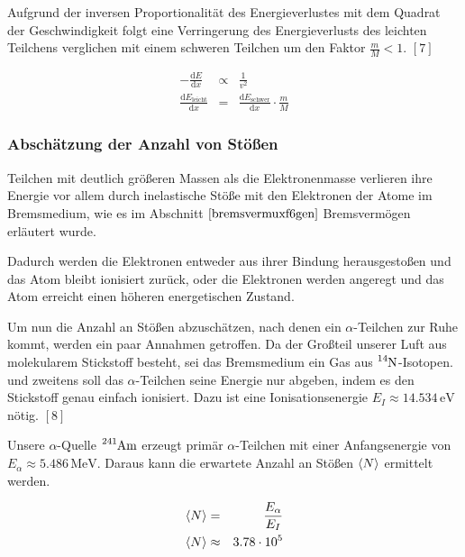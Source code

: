 \documentclass[12pt,a4paper]{scrartcl}
\numberwithin{equation}{section} %
\renewcommand{\[}{} %
\renewcommand{\]}{\noindent} %
\begin{document}
Aufgrund der inversen Proportionalität des Energieverlustes mit dem
Quadrat der Geschwindigkeit folgt eine Verringerung des Energieverlusts
des leichten Teilchens verglichen mit einem schweren Teilchen um den
Faktor \(\frac{m}{M} < 1\). \([7]\)

\[
\begin{eqnarray}
    - \frac{\mathrm dE}{\mathrm dx} &\propto& \frac{1}{v^2} \\
    \frac{\mathrm dE_\mathrm{leicht}}{\mathrm dx}
        &=& \frac{\mathrm dE_\mathrm{schwer}}{\mathrm dx}
            \cdot \frac{m}{M}
\end{eqnarray}
\]

\hypertarget{abschuxe4tzung-der-anzahl-von-stuxf6uxdfen}{%
\subsubsection{Abschätzung der Anzahl von
Stößen}\label{abschuxe4tzung-der-anzahl-von-stuxf6uxdfen}}

Teilchen mit deutlich größeren Massen als die Elektronenmasse verlieren
ihre Energie vor allem durch inelastische Stöße mit den Elektronen der
Atome im Bremsmedium, wie es im Abschnitt \(\ref{bremsvermuxf6gen}\)
Bremsvermögen erläutert wurde.

Dadurch werden die Elektronen entweder aus ihrer Bindung herausgestoßen
und das Atom bleibt ionisiert zurück, oder die Elektronen werden
angeregt und das Atom erreicht einen höheren energetischen Zustand.

Um nun die Anzahl an Stößen abzuschätzen, nach denen ein
\(\alpha\)-Teilchen zur Ruhe kommt, werden ein paar Annahmen getroffen.
Da der Großteil unserer Luft aus molekularem Stickstoff besteht, sei das
Bremsmedium ein Gas aus \(\ce{^{14}N}\)-Isotopen. und zweitens soll das
\(\alpha\)-Teilchen seine Energie nur abgeben, indem es den Stickstoff
genau einfach ionisiert. Dazu ist eine Ionisationsenergie
\(E_I\approx 14.534 \mathrm{\,eV}\) nötig. \([8]\)

Unsere \(\alpha\)-Quelle \(\ce{^{241}Am}\) erzeugt primär
\(\alpha\)-Teilchen mit einer Anfangsenergie von
\(E_\alpha\approx 5.486 \mathrm{\,MeV}\). Daraus kann die erwartete
Anzahl an Stößen \(\expval{N}\) ermittelt werden.

\[
\begin{eqnarray}
    \expval{N} &=& \frac{E_\alpha}{E_I} \\
    \expval{N} &\approx& 3.78 \cdot 10^5
\end{eqnarray}
\]
\end{document}
